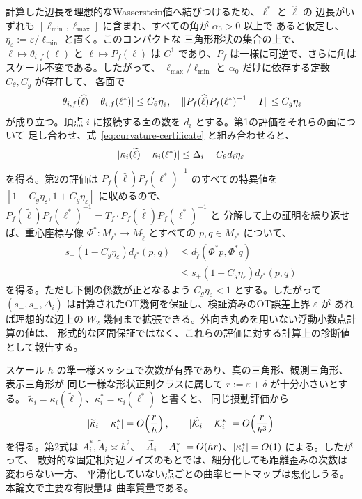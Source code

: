 計算した辺長を理想的なWasserstein値へ結びつけるため、$\ell^*$ と $\widehat\ell$ の
辺長がいずれも $[\ell_{\min},\ell_{\max}]$ に含まれ、すべての角が $\alpha_0>0$ 以上で
あると仮定し、$\eta_\varepsilon:=\varepsilon/\ell_{\min}$ と置く。このコンパクトな
三角形形状の集合の上で、$\ell\mapsto\theta_{i,f}(\ell)$ と $\ell\mapsto P_f(\ell)$ は
$C^1$ であり、$P_f$ は一様に可逆で、さらに角はスケール不変である。したがって、
$\ell_{\max}/\ell_{\min}$ と $\alpha_0$ だけに依存する定数 $C_\theta,C_g$ が存在して、
各面で
\begin{equation}
 \lvert \theta_{i,f}(\widehat\ell)-\theta_{i,f}(\ell^*)\rvert
 \le C_\theta\eta_\varepsilon,
 \quad
 \lVert P_f(\widehat\ell)P_f(\ell^*)^{-1}-I\rVert
 \le C_g\eta_\varepsilon
 \label{eq:ot-perturbation}
\end{equation}
が成り立つ。頂点 $i$ に接続する面の数を $d_i$ とする。第1の評価をそれらの面について
足し合わせ、式~\eqref{eq:curvature-certificate} と組み合わせると、
\begin{equation}
 \lvert \kappa_i(\widetilde\ell)-\kappa_i(\ell^*)\rvert
 \le \Delta_i+C_\theta d_i\eta_\varepsilon
 \label{eq:ideal-curvature-certificate}
\end{equation}
を得る。第2の評価は $P_f(\widehat\ell)P_f(\ell^*)^{-1}$ のすべての特異値を
$[1-C_g\eta_\varepsilon,1+C_g\eta_\varepsilon]$ に収めるので、
$P_f(\widetilde\ell)P_f(\ell^*)^{-1}=T_f\cdot P_f(\widehat\ell)P_f(\ell^*)^{-1}$ と
分解して上の証明を繰り返せば、重心座標写像
$\Phi^*:M_{\ell^*}\to M_{\widetilde\ell}$ とすべての $p,q\in M_{\ell^*}$ について、
\begin{equation}
 \begin{aligned}
 s_-(1-C_g\eta_\varepsilon)d_{\ell^*}(p,q)
 &\le d_{\widetilde\ell}(\Phi^*p,\Phi^*q)\\
 &\le s_+(1+C_g\eta_\varepsilon)d_{\ell^*}(p,q)
 \end{aligned}
 \label{eq:ideal-distance-certificate}
\end{equation}
を得る。ただし下側の係数が正となるよう $C_g\eta_\varepsilon<1$ とする。したがって
$(s_-,s_+,\Delta_i)$ は計算されたOT幾何を保証し、検証済みのOT誤差上界 $\varepsilon$ が
あれば理想的な辺上の $W_2$ 幾何まで拡張できる。外向き丸めを用いない浮動小数点計算の値は、
形式的な区間保証ではなく、これらの評価に対する計算上の診断値として報告する。

スケール $h$ の準一様メッシュで次数が有界であり、真の三角形、観測三角形、表示三角形が
同じ一様な形状正則クラスに属して $r:=\varepsilon+\delta$ が十分小さいとする。
$\widetilde\kappa_i=\kappa_i(\widetilde\ell)$、$\kappa_i^*=\kappa_i(\ell^*)$ と書くと、
同じ摂動評価から
\begin{equation}
 \lvert \widetilde\kappa_i-\kappa_i^*\rvert=O\!\left(\frac{r}{h}\right),
 \qquad
 \lvert \widetilde{\mathcal K}_i-\mathcal K_i^*\rvert=O\!\left(\frac{r}{h^3}\right)
 \label{eq:density-scaling}
\end{equation}
を得る。第2式は $A_i^*,\widetilde A_i\asymp h^2$、
$\lvert \widetilde A_i-A_i^*\rvert=O(hr)$、$\lvert \kappa_i^*\rvert=O(1)$ による。したがって、
敵対的な固定相対辺ノイズのもとでは、細分化しても距離歪みの次数は変わらない一方、
平滑化していない点ごとの曲率ヒートマップは悪化しうる。本論文で主要な有限量は
曲率質量である。

